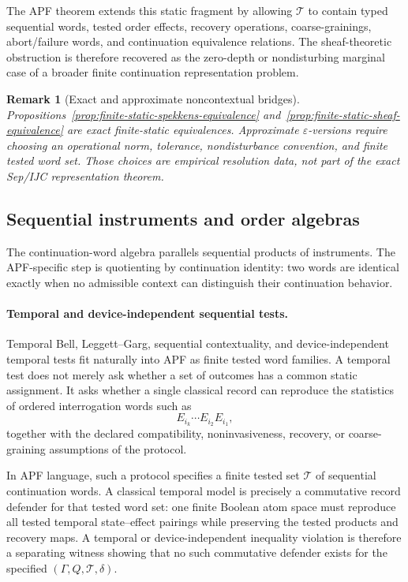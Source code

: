 \documentclass[11pt]{article}
\newtheorem{remark}[theorem]{Remark}
\begin{document}
The APF theorem extends this static fragment by allowing $\mathcal T$
to contain typed sequential words, tested order effects, recovery
operations, coarse-grainings, abort/failure words, and continuation
equivalence relations.  The sheaf-theoretic obstruction is therefore
recovered as the zero-depth or nondisturbing marginal case of a
broader finite continuation representation problem.

\begin{remark}[Exact and approximate noncontextual bridges]\label{rem:exact-approx-noncontextual-bridges}
Propositions~\ref{prop:finite-static-spekkens-equivalence} and~\ref{prop:finite-static-sheaf-equivalence} are exact finite-static equivalences.  Approximate \(\varepsilon\)-versions require choosing an operational norm, tolerance, nondisturbance convention, and finite tested word set.  Those choices are empirical resolution data, not part of the exact Sep/IJC representation theorem.
\end{remark}

\subsection*{Sequential instruments and order algebras}
The continuation-word algebra parallels sequential products of instruments.  The APF-specific step is quotienting by continuation identity: two words are identical exactly when no admissible context can distinguish their continuation behavior.

\paragraph{Temporal and device-independent sequential tests.}
Temporal Bell, Leggett--Garg, sequential contextuality, and
device-independent temporal tests fit naturally into APF as finite
tested word families.  A temporal test does not merely ask whether a
set of outcomes has a common static assignment.  It asks whether a
single classical record can reproduce the statistics of ordered
interrogation words such as
\[
    E_{i_k}\cdots E_{i_2} E_{i_1},
\]
together with the declared compatibility, noninvasiveness, recovery,
or coarse-graining assumptions of the protocol.

In APF language, such a protocol specifies a finite tested set
$\mathcal T$ of sequential continuation words.  A classical temporal
model is precisely a commutative record defender for that tested word
set: one finite Boolean atom space must reproduce all tested temporal
state--effect pairings while preserving the tested products and
recovery maps.  A temporal or device-independent inequality violation
is therefore a separating witness showing that no such commutative
defender exists for the specified $(\Gamma,Q,\mathcal T,\delta)$.
\end{document}
